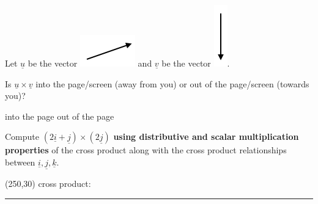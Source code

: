 \documentclass[12pt,letterpaper,noanswers]{exam}
\newcommand{\mb}[1]{\underline{#1}}
\begin{document}
\begin{questions}
\item Let $\mb{u}$ be the vector \includegraphics[scale=0.5]{img/C06p1a.png} and $\mb{v}$ be the vector \includegraphics[scale=0.5]{img/C06p1b.png}.

Is $\mb{u}\times\mb{v}$ into the page/screen (away from you) or out of the page/screen (towards you)?

\begin{oneparcheckboxes}
\choice into the page
\choice out of the page
\end{oneparcheckboxes}

\item Compute $(2\mb{i}+\mb{j})\times(2\mb{j})$ \textbf{using distributive and scalar multiplication properties} of the cross product along with the cross product relationships between $\mb{i},\mb{j},\mb{k}$.

\framebox(250,30){ cross product:\hfill }
\end{questions}

\vspace{0.2cm}

\hrule
\vspace{0.2cm}
\end{document}
